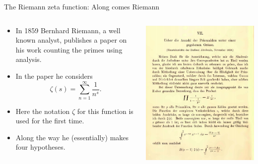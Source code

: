 \documentclass{beamer}
\begin{document}
\begin{frame}{The Riemann zeta function: Along comes Riemann}
\begin{columns}
\begin{column}{.575\textwidth}
\begin{itemize}
\item In 1859 Bernhard Riemann, a well known analyst, publishes a paper on his work counting the primes using analysis.
\item<2-> In the paper he considers
\[
\zeta(s) = \sum_{n=1}^{\infty} \frac{1}{n^s}.
\]
\item<3-> Here the notation $\zeta$ for this function is used for the first time.
\item<4-> Along the way he (essentially) makes four hypotheses.
\end{itemize}
\end{column}
\begin{column}{.425\textwidth}
\includegraphics[width=\textwidth]{img/ueber}
\end{column}
\end{columns}
\end{frame}
\end{document}
